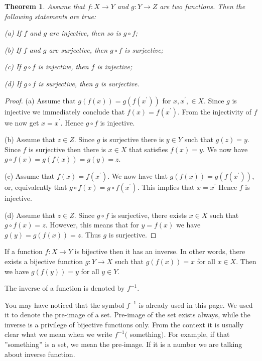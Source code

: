 \documentclass[11pt]{article}
\newtheorem{thm}{Theorem}[section]
\theoremstyle{definition}
\theoremstyle{plain}
\begin{document}
\begin{thm}
Assume that \( f:X\to Y \) and \( g:Y\to Z \) are two functions. Then the following statements are true:

(a) If \( f \) and \( g \) are injective, then so is \( g\circ f \);

(b) If \( f \) and \( g \) are surjective, then \( g\circ f \) is surjective;

(c) If \( g\circ f \) is injective, then \( f \) is injective;

(d) If \( g\circ f \) is surjective, then \( g \) is surjective.
\end{thm}
\begin{proof}
(a) Assume that \( g(f(x))=g(f(x^{\prime})) \) for \( x,x^{\prime},\in X \). Since \( g \) is injective we immediately conclude that \( f(x)=f(x^{\prime}) \). From the injectivity of \( f \) we now get \( x=x^{\prime} \). Hence \( g\circ f \) is injective.

(b) Assume that \( z\in Z \). Since \( g \) is surjective there is \( y\in Y \) such that \( g(z)=y \). Since \( f \) is surjective then there is \( x\in X \) that satisfies \( f(x)=y \). We now have \( g\circ f(x)=g(f(x))=g(y)=z \).

(c) Assume that \( f(x)=f(x^{\prime}) \). We now have that \( g(f(x))=g(f(x^{\prime})) \), or, equivalently that \( g\circ f(x)=g\circ f(x^{\prime}) \). This implies that \( x=x^{\prime} \) Hence \( f \) is injective.

(d) Assume that \( z\in Z \). Since \( g\circ f \) is surjective, there exists \( x\in X \) such that \( g\circ f(x)=z \). However, this means that for \( y=f(x) \) we have \( g(y)=g(f(x))=z \). Thus \( g \) is surjective.
\end{proof}

If a function \( f:X\to Y \) is bijective then it has an inverse. In other words, there exists a bijective function \( g:Y\to X \) such that \( g(f(x))=x \) for all \( x\in X \). Then we have \( g(f(y))=y \) for all \( y\in Y \).

The inverse of a function is denoted by \( f^{-1} \).

You may have noticed that the symbol \( f^{-1} \) is already used in this page. We used it to denote the pre-image of a set. Pre-image of the set exists always, while the inverse is a privilege of bijective functions only. From the context it is usually clear what we mean when we write \( f^{-1}( \) something\( ) \). For example, if that ''something'' is a set, we mean the pre-image. If it is a number we are talking about inverse function.
\end{document}

